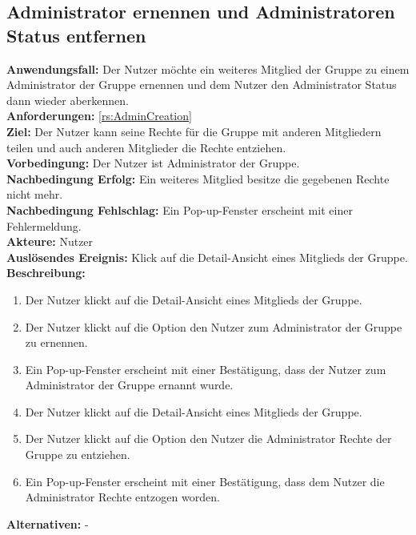 \documentclass[parskip=full]{scrartcl}
\begin{document}
\subsection{Administrator ernennen und Administratoren Status entfernen}
\textbf{Anwendungsfall:} Der Nutzer möchte ein weiteres Mitglied der Gruppe zu einem Administrator der Gruppe ernennen und dem Nutzer den Administrator Status dann wieder aberkennen.\\
\textbf{Anforderungen:} \ref{rs:AdminCreation}\\
\textbf{Ziel:} Der Nutzer kann seine Rechte für die Gruppe mit anderen Mitgliedern teilen und auch anderen Mitglieder die Rechte entziehen.\\
\textbf{Vorbedingung:} Der Nutzer ist Administrator der Gruppe.\\
\textbf{Nachbedingung Erfolg:} Ein weiteres Mitglied besitze die gegebenen Rechte nicht mehr.\\
\textbf{Nachbedingung Fehlschlag:} Ein Pop-up-Fenster erscheint mit einer Fehlermeldung.\\
\textbf{Akteure:} Nutzer \\
\textbf{Auslösendes Ereignis:} Klick auf die Detail-Ansicht eines Mitglieds der Gruppe.\\
\textbf{Beschreibung:}
\begin{enumerate}
    \item Der Nutzer klickt auf die Detail-Ansicht eines Mitglieds der Gruppe.
    \item Der Nutzer klickt auf die Option den Nutzer zum Administrator der Gruppe zu ernennen.
    \item Ein Pop-up-Fenster erscheint mit einer Bestätigung, dass der Nutzer zum Administrator der Gruppe ernannt wurde.
    \item Der Nutzer klickt auf die Detail-Ansicht eines Mitglieds der Gruppe.
    \item Der Nutzer klickt auf die Option den Nutzer die Administrator Rechte der Gruppe zu entziehen.
    \item Ein Pop-up-Fenster erscheint mit einer Bestätigung, dass dem Nutzer die Administrator Rechte entzogen worden.
\end{enumerate}
\textbf{Alternativen:} -
\newpage
\end{document}
